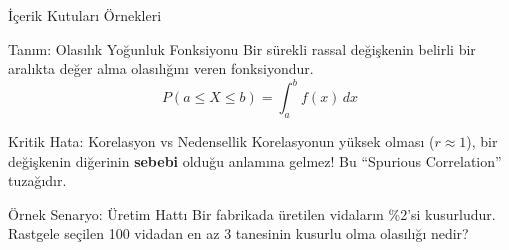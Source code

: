 % 

\begin{frame}{İçerik Kutuları Örnekleri}

    \begin{block}{Tanım: Olasılık Yoğunluk Fonksiyonu}
        Bir sürekli rassal değişkenin belirli bir aralıkta değer alma olasılığını veren fonksiyondur.
        \[ P(a \le X \le b) = \int_{a}^{b} f(x) \,dx \]
    \end{block}

    \vspace{1em}

    \begin{alertblock}{Kritik Hata: Korelasyon vs Nedensellik}
        Korelasyonun yüksek olması ($r \approx 1$), bir değişkenin diğerinin \textbf{sebebi} olduğu anlamına gelmez! Bu ``Spurious Correlation'' tuzağıdır.
    \end{alertblock}

    \vspace{1em}

    \begin{exampleblock}{Örnek Senaryo: Üretim Hattı}
        Bir fabrikada üretilen vidaların \%2'si kusurludur. Rastgele seçilen 100 vidadan en az 3 tanesinin kusurlu olma olasılığı nedir?
    \end{exampleblock}

\end{frame}

